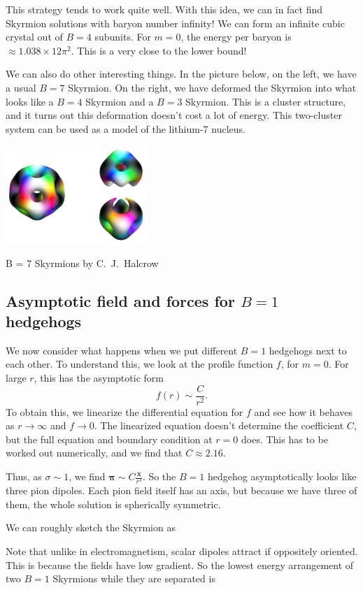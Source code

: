 \documentclass[a4paper]{article}
\begin{document}
This strategy tends to work quite well. With this idea, we can in fact find Skyrmion solutions with baryon number infinity! We can form an infinite cubic crystal out of $B = 4$ subunits. For $m = 0$, the energy per baryon is $\approx 1.038 \times 12 \pi^2$. This is a very close to the lower bound!

We can also do other interesting things. In the picture below, on the left, we have a usual $B = 7$ Skyrmion. On the right, we have deformed the Skyrmion into what looks like a $B = 4$ Skyrmion and a $B = 3$ Skyrmion. This is a cluster structure, and it turns out this deformation doesn't cost a lot of energy. This two-cluster system can be used as a model of the lithium-7 nucleus.
\begin{center}
  \includegraphics[clip, width=0.4\textwidth]{images/B-7-Cluster.pdf}

  B = 7 Skyrmions by C.\ J.\ Halcrow
\end{center}

\subsection{Asymptotic field and forces for \texorpdfstring{$B = 1$}{B = 1} hedgehogs}
We now consider what happens when we put different $B = 1$ hedgehogs next to each other. To understand this, we look at the profile function $f$, for $m = 0$. For large $r$, this has the asymptotic form
\[
  f(r) \sim \frac{C}{r^2}.
\]
To obtain this, we linearize the differential equation for $f$ and see how it behaves as $r \to \infty$ and $f \to 0$. The linearized equation doesn't determine the coefficient $C$, but the full equation and boundary condition at $r = 0$ does. This has to be worked out numerically, and we find that $C \approx 2.16$.

Thus, as $ \sigma \sim 1$, we find $\boldsymbol\pi \sim C \frac{\mathbf{x}}{r^3}$. So the $B = 1$ hedgehog asymptotically looks like three pion dipoles. Each pion field itself has an axis, but because we have three of them, the whole solution is spherically symmetric.

We can roughly sketch the Skyrmion as
\begin{center}
\end{center}
Note that unlike in electromagnetism, scalar dipoles attract if oppositely oriented. This is because the fields have low gradient. So the lowest energy arrangement of two $B = 1$ Skyrmions while they are separated is
\end{document}
